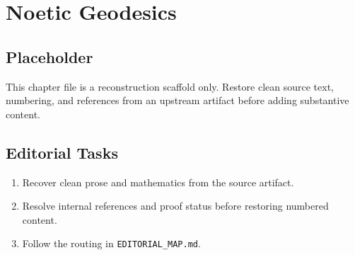 \chapter{Noetic Geodesics}
\label{chap:noetic-geodesics}

\section*{Placeholder}
This chapter file is a reconstruction scaffold only. Restore clean source text, numbering, and references from an upstream artifact before adding substantive content.

\section*{Editorial Tasks}
\begin{enumerate}
\item Recover clean prose and mathematics from the source artifact.
\item Resolve internal references and proof status before restoring numbered content.
\item Follow the routing in \texttt{EDITORIAL\_MAP.md}.
\end{enumerate}
